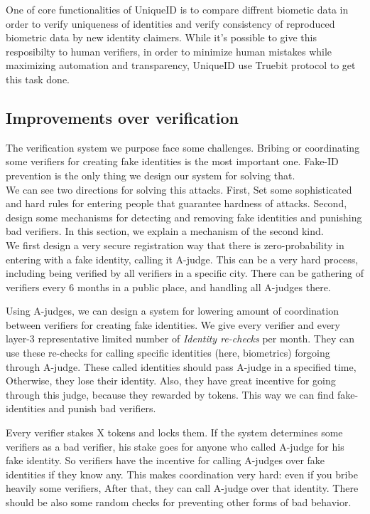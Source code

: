 \documentclass[conference]{IEEEtran}
\begin{document}
One of core functionalities of UniqueID is to compare diffrent biometic data in order to verify uniqueness of identities and verify consistency of reproduced biometric data by new identity claimers. While it's possible to give this resposibilty to human verifiers, in order to minimize human mistakes while maximizing automation and transparency, UniqueID use Truebit \cite{Truebit} protocol to get this task done. 

\subsection{Improvements over verification}
The verification system we purpose face some challenges. Bribing or coordinating some verifiers for creating fake identities is the most important one. Fake-ID prevention is the only thing we design our system for solving that. \\
We can see two directions for solving this attacks. First, Set some sophisticated and hard rules for entering people that guarantee hardness of attacks. Second, design some mechanisms for detecting and removing fake identities and punishing bad verifiers. In this section, we explain a mechanism of the second kind. \\
We first design a very secure registration way that there is zero-probability in entering with a fake identity, calling it A-judge. This can be a very hard process, including being verified by all verifiers in a specific city. There can be gathering of verifiers every 6 months in a public place, and handling all A-judges there.


Using A-judges, we can design a system for lowering amount of coordination between verifiers for creating fake identities. We give every verifier and every layer-3 representative limited number of \textit{Identity re-checks} per month. They can use these re-checks for calling specific identities (here, biometrics) forgoing through A-judge. These called identities should pass A-judge in a specified time, Otherwise, they lose their identity. Also, they have great incentive for going through this judge, because they rewarded by tokens. This way we can find fake-identities and punish bad verifiers.


Every verifier stakes X tokens and locks them. If the system determines some verifiers as a bad verifier, his stake goes for anyone who called A-judge for his fake identity. So verifiers have the incentive for calling A-judges over fake identities if they know any. This makes coordination very hard: even if you bribe heavily some verifiers, After that, they can call A-judge over that identity. There should be also some random checks for preventing other forms of bad behavior.
\end{document}
